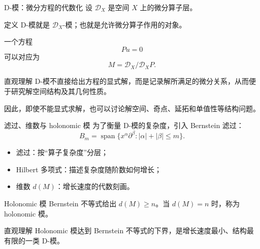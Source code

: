 \documentclass[aspectratio=169,11pt]{ctexbeamer}
\newcommand{\D}{\mathcal{D}}
\begin{document}
\begin{frame}{D-模：微分方程的代数化}
    设 $\D_X$ 是空间 $X$ 上的微分算子层。
    \pause
    \begin{block}{定义}
        D-模就是 $\D_X$-模；也就是允许微分算子作用的对象。
    \end{block}
    \pause
    一个方程
    \[
        P u=0
    \]
    可以对应为
    \[
        M=\D_X/\D_XP.
    \]
    \pause
    \begin{block}{直观理解}
        D-模不直接给出方程的显式解，而是记录解所满足的微分关系，从而便于研究解空间结构及其几何性质。
    \end{block}

    \vspace{0.6em}
    因此，即使不能显式求解，也可以讨论解空间、奇点、延拓和单值性等结构问题。

\end{frame}

\begin{frame}{滤过、维数与 holonomic 模}
    为了衡量 D-模的复杂度，引入 Bernstein 滤过：
    \[
        B_m=\operatorname{span}\{x^\alpha\partial^\beta:|\alpha|+|\beta|\le m\}.
    \]

    \begin{itemize}
        \item 滤过：按“算子复杂度”分层；
        \item Hilbert 多项式：描述复杂度随阶数如何增长；
        \item 维数 $d(M)$：增长速度的代数刻画。
    \end{itemize}
    \pause
    \begin{block}{Holonomic 模}
        Bernstein 不等式给出 $d(M)\ge n$。当 $d(M)=n$ 时，称为 holonomic 模。
    \end{block}
    \pause
    \begin{block}{直观理解}
        Holonomic 模达到 Bernstein 不等式的下界，是增长速度最小、结构最有限的一类 D-模。
    \end{block}

\end{frame}
\end{document}
